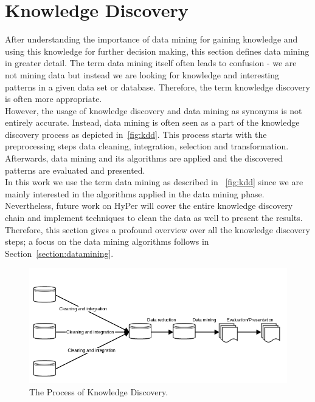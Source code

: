 \section{Knowledge Discovery}

After understanding the importance of data mining for gaining knowledge and using this knowledge for further decision making, this section defines data mining in greater detail. The term data mining itself often leads to confusion - we are not mining data but instead we are looking for knowledge and interesting patterns in a given data set or database. Therefore, the term knowledge discovery is often more appropriate.
\\
However, the usage of knowledge discovery and data mining as synonyms is not entirely accurate. Instead, data mining is often seen as a part of the knowledge discovery process as depicted in~\autoref{fig:kdd}. This process starts with the preprocessing steps data cleaning, integration, selection and transformation. Afterwards, data mining and its algorithms are applied and the discovered patterns are evaluated and presented. 
\\
In this work we use the term data mining as described in ~\autoref{fig:kdd} since we are mainly interested in the algorithms applied in the data mining phase. Nevertheless, future work on HyPer will cover the entire knowledge discovery chain and implement techniques to clean the data as well to present the results. Therefore, this section gives a profound overview over all the knowledge discovery steps; a focus on the data mining algorithms follows in Section~\ref{section:datamining}.


\begin{figure}[htsb]
  \centerline{
    \includegraphics[scale=0.6]{figures/kdd}
  }
  \caption[The Process of Knowledge Discovery]{The Process of Knowledge Discovery.}\label{fig:kdd}
\end{figure}



